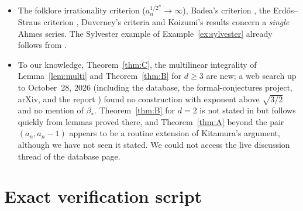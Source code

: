 \documentclass[11pt]{amsart}
\theoremstyle{definition}
\theoremstyle{remark}
\begin{document}
\begin{itemize}[leftmargin=1.4em]
a construction with regular growth exponent $\sqrt{3/2}=1.2247\ldots$ by a fixed-window
block method and argues that such block methods cannot exceed $\sqrt{5/3}=1.2909\ldots$;
we have not verified these claims. Theorem~\ref{thm:C} uses a different, sequential
method and gives every exponent below $\beta_*=1.3027\ldots$.
\item The folklore irrationality criterion ($a_n^{1/2^n}\to\infty$), Badea's criterion
\cite{Badea87}, the Erd\H{o}s--Straus criterion \cite{ErSt64}, Duverney's criteria
\cite{Duverney01} and Koizumi's results \cite{Koizumi25} concern a \emph{single} Ahmes
series. The Sylvester example of Example~\ref{ex:sylvester} already follows from
\cite{Duverney01}.
\item To our knowledge, Theorem~\ref{thm:C}, the multilinear integrality of
Lemma~\ref{lem:multi} and Theorem~\ref{thm:B} for $d\ge3$ are new; a web search up to
October~28, 2026 (including the database, the formal-conjectures project, arXiv, and the
report \cite{EPAD265}) found no construction with exponent above $\sqrt{3/2}$ and no
mention of $\beta_*$. Theorem~\ref{thm:B} for $d=2$ is not stated in \cite{Kit26} but
follows quickly from lemmas proved there, and Theorem~\ref{thm:A} beyond the pair
$(a_n,a_n-1)$ appears to be a routine extension of Kitamura's argument, although we have
not seen it stated. We could not access the live discussion thread of the database
page.
\end{itemize}

\appendix
\section{Exact verification script}\label{app:scripts}
\end{document}
